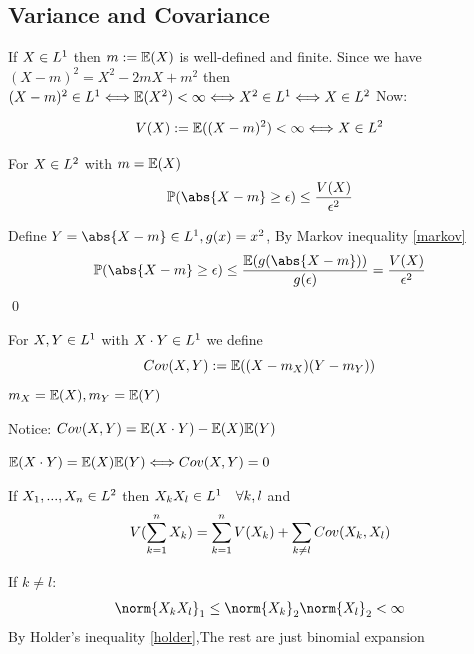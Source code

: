 \subsection*{Variance and Covariance}
If $X\in L^{1}$ then $m := \mathbb{E}(X)$ is well-defined and finite. Since we have $(X-m)^2 = X^2 - 2mX + m^2$ then $(X-m)^2\in L^{1}\Longleftrightarrow \mathbb{E}(X^2) < \infty \Longleftrightarrow X^2\in L^{1} \Longleftrightarrow X\in L^{2}$ Now:
\begin{dfn}[Variance of $X$]
\begin{equation*}
    V(X) := \mathbb{E}((X-m)^2) < \infty \Longleftrightarrow X\in L^{2}
\end{equation*}
\end{dfn}
\begin{thm}
\label{Chebyshev}
For $X\in L^{2}$ with $m = \mathbb{E}(X)$
\begin{equation*}
    \prob(\abs{X-m}\geq \epsilon) \leq \frac{V(X)}{\epsilon^2}
\end{equation*}
\end{thm}
\pf Define $Y = \abs{X-m}\in \ls{1}, g(x)=x^2 $, By Markov inequality \ref{markov}
\begin{equation*}
\prob(\abs{X-m}\geq \epsilon) \leq \frac{\E(g(\abs{X-m}))}{g(\epsilon)} =  \frac{V(X)}{\epsilon^2}   
\end{equation*}\qed
\begin{dfn}
For $X,Y\in L^{1}$ with $X\cdot Y\in L^{1}$ we define 
\begin{equation*}
    Cov(X,Y) := \mathbb{E}((X-m_X)(Y-m_Y))
\end{equation*}$m_X = \mathbb{E}(X) , m_Y = \mathbb{E}(Y)$
\end{dfn}Notice: $Cov(X,Y) = \mathbb{E}(X\cdot Y) - \mathbb{E}(X)\mathbb{E}(Y)$
\begin{dfn}
$\mathbb{E}(X\cdot Y) = \mathbb{E}(X)\mathbb{E}(Y) \Longleftrightarrow Cov(X,Y) = 0$
\end{dfn}
\begin{lem}
If $X_1,...,X_n \in L^{2}$ then $X_k X_l \in L^{1} \quad\forall k,l$ and \begin{equation*}
    V(\sum\limits_{k=1}^n X_k) = \sum\limits_{k=1}^n V(X_k) + \sum\limits_{k\neq l}Cov(X_k,X_l)
\end{equation*}
\end{lem}
\pf If $k \neq l:$
\begin{equation*}
    \norm{X_k X_l}_1 \leq \norm{X_k}_2\norm{X_l}_2 < \infty
\end{equation*}By Holder's inequality \ref{holder},The rest are just binomial expansion \\

